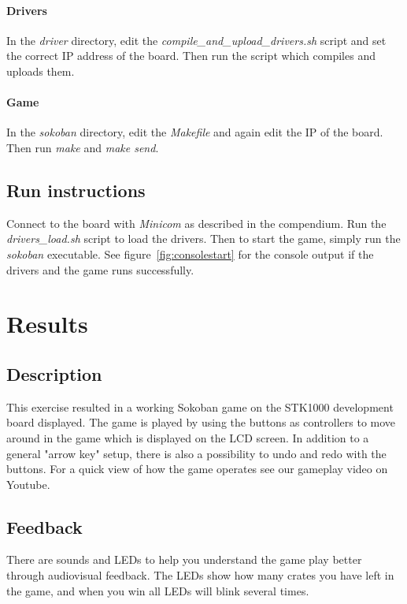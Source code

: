 \documentclass[a4paper,11pt]{article}
\begin{document}
\paragraph{Drivers}
In the \textit{driver} directory, edit the \textit{compile\_and\_upload\_drivers.sh} script and set the correct IP address of the board. Then run the script which compiles and uploads them.

\paragraph{Game}
In the \textit{sokoban} directory, edit the \textit{Makefile} and again edit the IP of the board. Then run \textit{make} and \textit{make send}.

\subsection{Run instructions}
Connect to the board with \textit{Minicom} as described in the compendium. Run the \textit{drivers\_load.sh} script to load the drivers. Then to start the game, simply run the \textit{sokoban} executable. See figure~\ref{fig:consolestart} for the console output if the drivers and the game runs successfully. 

\section{Results}
\subsection{Description} 

This exercise resulted in a working Sokoban game on the STK1000 development board displayed. The game is played by using the buttons as controllers to move around in the game which is displayed on the LCD screen. In addition to a general "arrow key" setup, there is also a possibility to undo and redo with the buttons. For a quick view of how the game operates see our gameplay video on Youtube\cite{youtube}.

\subsection{Feedback}There are sounds and LEDs to help you understand the game play better through audiovisual feedback. The LEDs show how many crates you have left in the game, and when you win all LEDs will blink several times.
\end{document}
